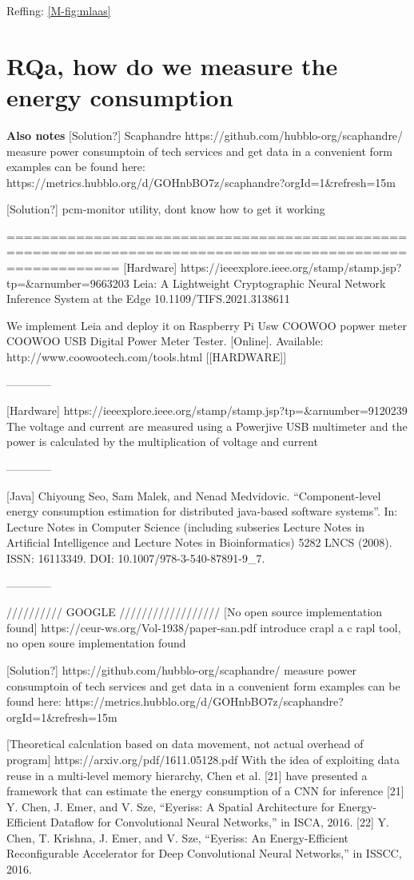 \documentclass[../thesis.tex]{subfiles}
\begin{document}
Reffing: \ref{M-fig:mlaas}
\section{RQa, how do we measure the energy consumption}
\color{red}\textbf{Also notes}\color{black}
[Solution?] Scaphandre
https://github.com/hubblo-org/scaphandre/
measure power consumptoin of tech services and get data in a convenient form
examples can be found here: https://metrics.hubblo.org/d/GOHnbBO7z/scaphandre?orgId=1&refresh=15m

[Solution?] pcm-monitor utility, dont know how to get it working

=========================================================================================================
[Hardware]
https://ieeexplore.ieee.org/stamp/stamp.jsp?tp=&arnumber=9663203
Leia: A Lightweight Cryptographic Neural Network Inference System at the Edge
 10.1109/TIFS.2021.3138611

We implement Leia and deploy it on Raspberry Pi
Usw COOWOO popwer meter COOWOO USB Digital Power Meter Tester. [Online]. Available:
http://www.coowootech.com/tools.html [[HARDWARE]]

------------

[Hardware]
https://ieeexplore.ieee.org/stamp/stamp.jsp?tp=&arnumber=9120239
The voltage and current are measured using a
Powerjive USB multimeter and the power is calculated by the
multiplication of voltage and current

------------

[Java] 
Chiyoung Seo, Sam Malek, and Nenad Medvidovic. “Component-level energy
consumption estimation for distributed java-based software systems”. In: Lecture Notes in Computer Science (including subseries Lecture Notes in Artificial Intelligence and Lecture Notes in Bioinformatics) 5282 LNCS (2008). ISSN:
16113349. DOI: 10.1007/978-3-540-87891-9\_7.

------------

////////// GOOGLE //////////////////
[No open source implementation found]
https://ceur-ws.org/Vol-1938/paper-san.pdf
introduce crapl a c rapl tool, no open soure implementation found

[Solution?]
https://github.com/hubblo-org/scaphandre/
measure power consumptoin of tech services and get data in a convenient form
examples can be found here: https://metrics.hubblo.org/d/GOHnbBO7z/scaphandre?orgId=1&refresh=15m

[Theoretical calculation based on data movement, not actual overhead of program]
https://arxiv.org/pdf/1611.05128.pdf
With the idea of exploiting data reuse in a multi-level memory hierarchy, Chen et al. [21] have presented a framework that can estimate the energy consumption of a CNN for inference
[21] Y. Chen, J. Emer, and V. Sze, “Eyeriss: A Spatial Architecture for Energy-Efficient Dataflow for Convolutional Neural Networks,” in ISCA, 2016.
[22] Y. Chen, T. Krishna, J. Emer, and V. Sze, “Eyeriss: An Energy-Efficient Reconfigurable Accelerator for Deep Convolutional Neural Networks,” in ISSCC, 2016.
\end{document}
